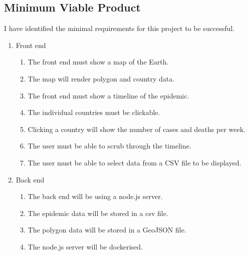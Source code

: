 \documentclass{article}
\begin{document}
\subsection{Minimum Viable Product}
I have identified the minimal requirements for this project to be successful.
\begin{enumerate}
    \item Front end
    \begin{enumerate}
        \item The front end must show a map of the Earth.
        \item The map will render polygon and country data.
        \item The front end must show a timeline of the epidemic.
        \item The individual countries must be clickable.
        \item Clicking a country will show the number of cases and deaths per week.
        \item The user must be able to scrub through the timeline.
        \item The user must be able to select data from a CSV file to be displayed.
    \end{enumerate}
    \item Back end
    \begin{enumerate}
        \item The back end will be using a node.js server.
        \item The epidemic data will be stored in a csv file.
        \item The polygon data will be stored in a GeoJSON file.
        \item The node.js server will be dockerised.
    \end{enumerate}
\end{enumerate}
\newpage
\end{document}
